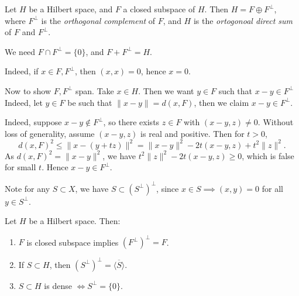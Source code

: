 \documentclass[12pt]{article}
\begin{document}
\begin{theorem}
	Let $H$ be a Hilbert space, and $F$ a closed subspace of $H$. Then $H = F \oplus F^{\perp}$, where $F^{\perp}$ is the \emph{orthogonal complement} of $F$, and $H$ is the \emph{ortogonoal direct sum} of $F$ and $F^{\perp}$.
\end{theorem}

\begin{proofbox}
	We need $F \cap F^{\perp} = \{0\}$, and $F + F^{\perp} = H$.

	Indeed, if $x \in F, F^{\perp}$, then $(x, x) = 0$, hence $x = 0$.

	Now to show $F, F^{\perp}$ span. Take $x \in H$. Then we want $y \in F$ such that $x - y \in F^{\perp}$ Indeed, let $y \in F$ be such that $\|x - y\| = d(x, F)$, then we claim $x - y \in F^{\perp}$.

	Indeed, suppose $x - y \not \in F^{\perp}$, so there exists $z \in F$ with $(x-y, z) \neq 0$. Without loss of generality, assume $(x-y, z)$ is real and positive. Then for $t > 0$,
	\[
	d(x, F)^2 \leq \|x - (y + tz)\|^2 = \|x - y\|^2 - 2t(x - y, z) + t^2 \|z\|^2.
	\]
	As $d(x, F)^2 = \|x - y\|^2$, we have $t^2\|z\|^2 - 2t(x-y,z) \geq 0$, which is false for small $t$. Hence $x - y \in F^{\perp}$.
\end{proofbox}

Note for any $S \subset X$, we have $S \subset (S^{\perp})^{\perp}$, since $x \in S \implies (x, y) = 0$ for all $y \in S^{\perp}$.

\begin{corollary}
	Let $H$ be a Hilbert space. Then:
	\begin{enumerate}[\normalfont(i)]
		\item $F$ is closed subspace implies $(F^{\perp})^{\perp} = F$.
		\item If $S \subset H$, then $(S^{\perp})^{\perp} = \overline{\langle S \rangle}$.
		\item $S \subset H$ is dense $\iff S^{\perp} = \{0\}$.
	\end{enumerate}
\end{corollary}
\end{document}
